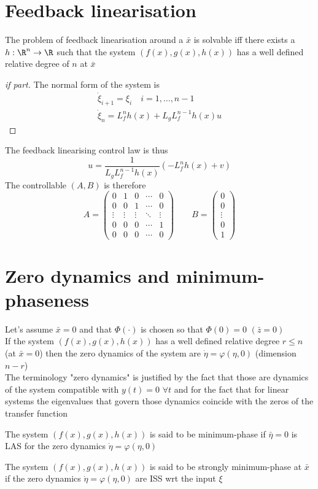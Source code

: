\documentclass[english]{lectures}
\begin{document}
\section{Feedback linearisation}
\begin{theorem}
    The problem of feedback linearisation around a $\bar{x}$ is solvable iff there exists a $h:\R^n\to\R$ such that the system $(f(x),g(x),h(x))$ has a well defined relative degree of $n$ at $\bar{x}$
\end{theorem}
\begin{proof}[if part]
    The normal form of the system is
    \begin{gather*}
        \dot{\xi}_{i+1}=\xi_i \quad i=1,\dots,n-1\\
        \dot{\xi}_n=L_f^nh(x)+L_gL_f^{n-1}h(x)u
    \end{gather*}
\end{proof}
The feedback linearising control law is thus
\[
    u=\frac{1}{L_gL_f^{n-1}h(x)}(-L_f^nh(x)+v)
\]
The controllable $(A,B)$ is therefore
\[
    A=\begin{pmatrix}
        0 & 1 & 0 & \cdots & 0\\
        0 & 0 & 1 & \cdots & 0\\
        \vdots & \vdots & \vdots & \ddots & \vdots\\
        0 & 0 & 0 & \cdots & 1\\
        0 & 0 & 0 & \cdots & 0
    \end{pmatrix} \qquad B=\begin{pmatrix}
        0 \\ 0 \\\vdots \\ 0 \\ 1
    \end{pmatrix}
\]

\section{Zero dynamics and minimum-phaseness}
Let's assume $\bar{x}=0$ and that $\Phi(\cdot)$ is chosen so that $\Phi(0)=0$ $(\bar{z}=0)$\\
If the system $(f(x),g(x),h(x))$ has a well defined relative degree $r\leq n $ (at $\bar{x}=0$) then the zero dynamics of the system are $\dot{\eta}=\varphi(\eta,0)$ (dimension $n-r$)\\
The terminology "zero dynamics" is justified by the fact that those are dynamics of the system compatible with $y(t)=0$  $\forall t$ and for the fact that for linear systems the eigenvalues that govern those dynamics coincide with the zeros of the transfer function

\begin{definition}
    The system $(f(x),g(x),h(x))$ is said to be minimum-phase if $\bar{\eta}=0$ is LAS for the zero dynamics $\dot{\eta}=\varphi(\eta,0)$
\end{definition}
\begin{definition}
    The system $(f(x),g(x),h(x))$ is said to be strongly minimum-phase at $\bar{x}$ if the zero dynamics $\dot{\eta}=\varphi(\eta,0)$ are ISS wrt the input $\xi$
\end{definition}
\end{document}
